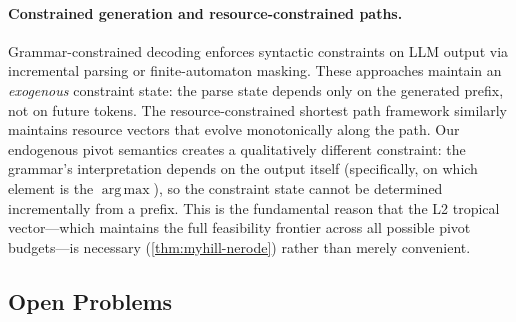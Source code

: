 \documentclass[11pt]{article}
\theoremstyle{plain}
\theoremstyle{definition}
\theoremstyle{remark}
\DeclareMathOperator*{\argmax}{arg\,max}
\begin{document}
\paragraph{Constrained generation and resource-constrained paths.}
Grammar-constrained decoding
\cite{scholak2021picard,willard2023efficient} enforces syntactic
constraints on LLM output via incremental parsing or finite-automaton
masking.  These approaches maintain an \emph{exogenous} constraint
state: the parse state depends only on the generated prefix, not on
future tokens.  The resource-constrained shortest path framework
\cite{irnich2005shortest} similarly maintains resource vectors that
evolve monotonically along the path.  Our endogenous pivot semantics
creates a qualitatively different constraint: the grammar's
interpretation depends on the output itself (specifically, on which
element is the $\argmax$), so the constraint state cannot be determined
incrementally from a prefix.  This is the fundamental reason that the
L2 tropical vector---which maintains the full feasibility frontier
across all possible pivot budgets---is necessary
(\cref{thm:myhill-nerode}) rather than merely convenient.

\subsection{Open Problems}
\end{document}
